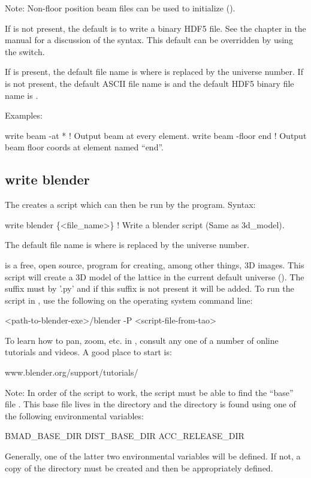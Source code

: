 {{{{{{{{{{{Note: Non-floor position beam files can be used to initialize \tao ().

If  is not present, the default is to write a binary HDF5 file. See the  chapter in the \bmad manual for a discussion of the syntax. This default can be overridden
by using the  switch.

If  is present, the default file name is  where \vn{\#} is
replaced by the universe number. If  is not present, the default ASCII file name
is  and the default HDF5 binary file name is .

Examples:
\begin{example}
  write beam -at *        ! Output beam at every element.
  write beam -floor end   ! Output beam floor coords at element named ``end''.
\end{example}


\subsection{write blender}
\label{s:write.blender}

The  creates a script which can then be run by
the  program\cite{b:blender}. Syntax:
\begin{example}
    write blender \{<file_name>\}            ! Write a blender script (Same as 3d_model).
\end{example}

The default file name is  where \vn{\#} is replaced by the universe number. 

 is a free, open source, program for creating, among other things, 3D images. This
script will create a 3D model of the lattice in the current default universe ().
The suffix must by '.py' and if this suffix is not present it will be added. To run the script in
, use the following on the operating system command line:
\begin{example}
  <path-to-blender-exe>/blender -P <script-file-from-tao>
\end{example}
To learn how to pan, zoom, etc. in , consult any one of a number of online tutorials and
videos. A good place to start is:
\begin{example}
  www.blender.org/support/tutorials/  
\end{example}
Note: In order of the script to work, the script must be able to find the ``base'' file
. This base file lives in the  directory and the 
directory is found using one of the following environmental variables:
\begin{example}
  BMAD_BASE_DIR
  DIST_BASE_DIR
  ACC_RELEASE_DIR
\end{example}
Generally, one of the latter two environmental variables will be defined.  If not, a copy of the
\bmad directory must be created and then  be appropriately defined.

}}}}}}}}}}}
